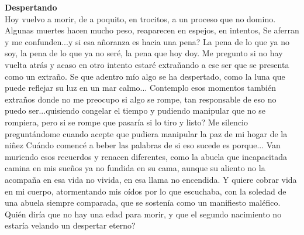 \documentclass[12pt, a4paper, twoside]{book} %
\begin{document}
\noindent\textbf{Despertando}\\
Hoy vuelvo a morir, de a poquito, en trocitos, a un proceso que no domino.
Algunas muertes hacen mucho peso, reaparecen en espejos, en intentos,
Se aferran y me confunden...y si esa añoranza es hacia una pena?
La pena de lo que ya no soy, la pena de lo que ya no seré, la pena que hoy doy.
Me pregunto si no hay vuelta atrás y acaso en otro intento estaré extrañando a ese ser que se presenta como un extraño.
Se que adentro mío algo se ha despertado, como la luna que puede reflejar su luz en un mar calmo...
Contemplo esos momentos también extraños donde no me preocupo si algo se rompe, tan responsable de eso no puedo ser...quisiendo congelar el tiempo  y pudiendo manipular que no se rompiera, pero si se rompe que pasaría si lo tiro y listo?
Me silencio preguntándome cuando acepte que pudiera manipular la paz  de mi hogar de la niñez
Cuándo comencé a beber las palabras de si eso sucede es porque...
Van muriendo esos recuerdos y renacen diferentes,  como la abuela que incapacitada camina en mis sueños ya no fundida en su cama, aunque su aliento no la acompaña en esa vida no vivida, en esa llama no encendida.
Y quiere cobrar vida en mi cuerpo, atormentando mis oídos por lo que escuchaba, con la soledad de una abuela siempre comparada, que se sostenía como un manifiesto maléfico.
Quién diría que no hay una edad para morir, y que el segundo nacimiento no estaría velando un despertar eterno?
\end{document}
